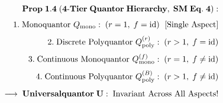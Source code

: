 \documentclass[preview]{standalone}
\begin{document}
\begin{align*}
\special{dvisvgm:raw <g id='unique000'>}\mathbf{Prop\;1.4\;(4\text{-}Tier\;Quantor\;Hierarchy,\;SM\;Eq.\;4):}\\[4pt]1.\;\text{Monoquantor }Q_{\text{mono}}:\; (r=1,\; f=\operatorname{id})\;\text{ [Single Aspect]}\\[3pt]2.\;\text{Discrete Polyquantor }Q_{\text{poly}}^{(r)}:\; (r>1,\; f=\operatorname{id})\\[3pt]3.\;\text{Continuous Monoquantor }Q_{\text{mono}}^{(f)}:\; (r=1,\; f\neq\operatorname{id})\\[3pt]4.\;\text{Continuous Polyquantor }Q_{\text{poly}}^{(B)}:\; (r>1,\; f\neq\operatorname{id})\\[4pt]\longrightarrow\;\mathbf{Universalquantor\;\mathbf{U}}:\;\text{Invariant Across All Aspects!}\special{dvisvgm:raw </g>}
\end{align*}
\end{document}

